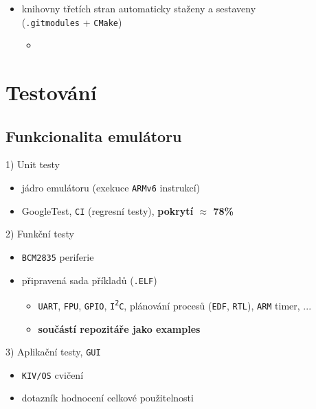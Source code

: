 \documentclass[compress]{beamer}
\begin{document}
\begin{frame}
	\vspace{-0.3cm}
	\begin{itemize}
		\item knihovny třetích stran automaticky staženy a sestaveny \\ (\texttt{.gitmodules} + \texttt{CMake})
		\begin{itemize}
			\item \href{https://github.com/google/googletest}{} \href{https://github.com/ocornut/imgui}{}
			\href{https://github.com/martin-olivier/dylib}{} 
			\href{https://github.com/serge1/ELFIO}{} 
			\href{https://github.com/glfw/glfw}{} 
			\href{https://github.com/capstone-engine/capstone}{}
		\end{itemize}
	\end{itemize}
\end{frame}

\section{Testování}

\subsection{Funkcionalita emulátoru}

\begin{frame}
	\begin{block}{1) Unit testy}
		\begin{itemize}
			\item jádro emulátoru (exekuce \texttt{ARMv6} instrukcí)
			\item GoogleTest, \texttt{CI} (regresní testy), \textbf{pokrytí $\approx$ 78\%}
		\end{itemize}
	\end{block}
	\begin{block}{2) Funkční testy}
		\begin{itemize}
			\item \texttt{BCM2835} periferie
			\item připravená sada příkladů (\texttt{.ELF})
			\begin{itemize}
				\item \texttt{UART}, \texttt{FPU}, \texttt{GPIO}, \texttt{I\textsuperscript{2}C}, plánování procesů (\texttt{EDF}, \texttt{RTL}), \texttt{ARM} timer, ...
				\item \textbf{součástí repozitáře jako examples}
			\end{itemize}
		\end{itemize}
	\end{block}
	\begin{block}{3) Aplikační testy, \texttt{GUI}}
		\begin{itemize}
			\item \texttt{KIV/OS} cvičení
			\item dotazník hodnocení celkové použitelnosti
		\end{itemize}
	\end{block}
\end{frame}
\end{document}
